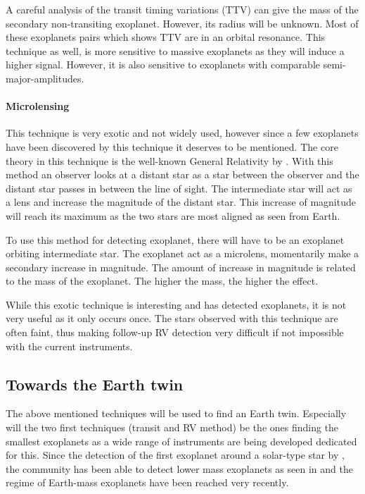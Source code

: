A careful analysis of the transit timing variations (TTV) can give the mass of the secondary
non-transiting exoplanet. However, its radius will be unknown. Most of these exoplanets pairs which
shows TTV are in an orbital resonance. This technique as well, is more sensitive to massive
exoplanets as they will induce a higher signal. However, it is also sensitive to exoplanets with
comparable semi-major-amplitudes.


\paragraph{Microlensing}

This technique is very exotic and not widely used, however since a few exoplanets have been
discovered by this technique it deserves to be mentioned. The core theory in this technique is the
well-known General Relativity by \citet{Einstein1916}. With this method an observer looks at a
distant star as a star between the observer and the distant star passes in between the line of
sight. The intermediate star will act as a lens and increase the magnitude of the distant star. This
increase of magnitude will reach its maximum as the two stars are most aligned as seen from Earth.

To use this method for detecting exoplanet, there will have to be an exoplanet orbiting intermediate
star. The exoplanet act as a microlens, momentarily make a secondary increase in magnitude. The
amount of increase in magnitude is related to the mass of the exoplanet. The higher the mass, the
higher the effect.

While this exotic technique is interesting and has detected exoplanets, it is not very useful as it
only occurs once. The stars observed with this technique are often faint, thus making follow-up RV
detection very difficult if not impossible with the current instruments.


\subsection{Towards the Earth twin}

The above mentioned techniques will be used to find an Earth twin. Especially will the two first
techniques (transit and RV method) be the ones finding the smallest exoplanets as a wide range of
instruments are being developed dedicated for this. Since the detection of the first exoplanet
around a solar-type star by \citet{Mayor1995}, the community has been able to detect lower mass
exoplanets as seen in  and the regime of Earth-mass exoplanets have been
reached very recently.

